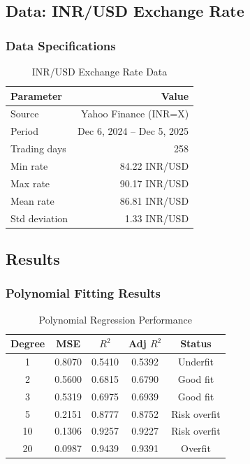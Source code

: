 \documentclass[12pt,a4paper]{article}
\begin{document}
\subsection{Data: INR/USD Exchange Rate}

\subsubsection{Data Specifications}

\begin{table}[H]
\centering
\caption{INR/USD Exchange Rate Data}
\label{tab:inr_data}
\begin{tabular}{@{}lr@{}}
\toprule
\textbf{Parameter} & \textbf{Value} \\
\midrule
Source & Yahoo Finance (INR=X) \\
Period & Dec 6, 2024 -- Dec 5, 2025 \\
Trading days & 258 \\
Min rate & 84.22 INR/USD \\
Max rate & 90.17 INR/USD \\
Mean rate & 86.81 INR/USD \\
Std deviation & 1.33 INR/USD \\
\bottomrule
\end{tabular}
\end{table}

\subsection{Results}

\subsubsection{Polynomial Fitting Results}

\begin{table}[H]
\centering
\caption{Polynomial Regression Performance}
\label{tab:poly_results}
\begin{tabular}{@{}ccccc@{}}
\toprule
\textbf{Degree} & \textbf{MSE} & \textbf{$R^2$} & \textbf{Adj $R^2$} & \textbf{Status} \\
\midrule
1 & 0.8070 & 0.5410 & 0.5392 & Underfit \\
2 & 0.5600 & 0.6815 & 0.6790 & Good fit \\
3 & 0.5319 & 0.6975 & 0.6939 & Good fit \\
5 & 0.2151 & 0.8777 & 0.8752 & Risk overfit \\
10 & 0.1306 & 0.9257 & 0.9227 & Risk overfit \\
20 & 0.0987 & 0.9439 & 0.9391 & Overfit \\
\bottomrule
\end{tabular}
\end{table}
\end{document}
